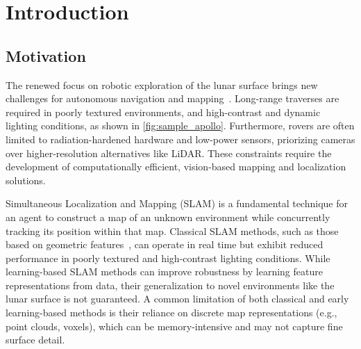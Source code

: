 \section{Introduction}

\subsection{Motivation}
The renewed focus on robotic exploration of the lunar surface brings new challenges for autonomous navigation and mapping~\cite{euroconsult_prospects_2023}. Long-range traverses are required in poorly textured environments, and high-contrast and dynamic lighting conditions, as shown in \cref{fig:sample_apollo}. Furthermore, rovers are often limited to radiation-hardened hardware and low-power sensors, priorizing cameras over higher-resolution alternatives like LiDAR. These constraints require the development of computationally efficient, vision-based mapping and localization solutions.

Simultaneous Localization and Mapping (SLAM) is a fundamental technique for an agent to construct a map of an unknown environment while concurrently tracking its position within that map. Classical SLAM methods, such as those based on geometric features~\cite{campos_orb-slam3_2021,newcombe_kinectfusion_2011}, can operate in real time but exhibit reduced performance in poorly textured and high-contrast lighting conditions. While learning-based SLAM methods can improve robustness by learning feature representations from data, their generalization to novel environments like the lunar surface is not guaranteed. A common limitation of both classical and early learning-based methods is their reliance on discrete map representations (e.g., point clouds, voxels), which can be memory-intensive and may not capture fine surface detail.

